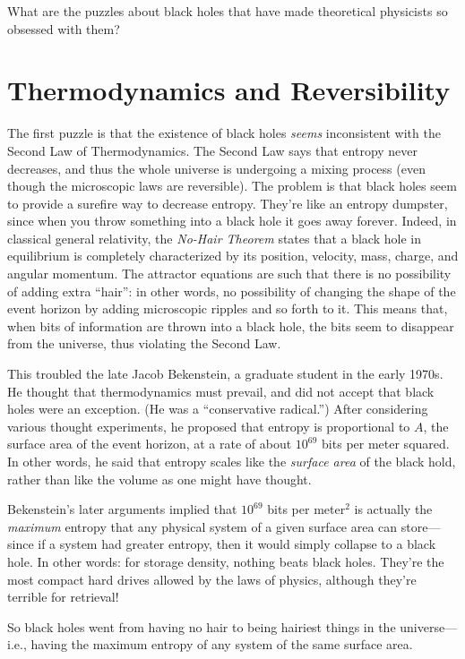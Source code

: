 \documentclass[11pt]{report}
\theoremstyle{plain}
\theoremstyle{definition}
\begin{document}
What are the puzzles about black holes that have made theoretical physicists so obsessed with them?

\section{Thermodynamics and Reversibility}

The first puzzle is that the existence of black holes {\em seems} inconsistent with
the Second Law of Thermodynamics.
The Second Law says that entropy never decreases,
and thus the whole universe is undergoing a mixing process
(even though the microscopic laws are reversible).
The problem is that black holes seem to provide a surefire way to decrease entropy. They're like
an entropy dumpster, since when you throw something into a black
hole it goes away forever.
Indeed, in classical general relativity, the {\it No-Hair Theorem}
states that a black hole in equilibrium is completely characterized by its
position, velocity,
mass, charge, and angular momentum.
The attractor equations are such that there
is no possibility of adding extra ``hair'': in other words, no possibility of changing
the shape of the event horizon by adding microscopic ripples and so forth to it.
This means that, when bits of information are
thrown into a black hole, the bits seem to disappear from the universe,
thus violating the Second Law.

This troubled the late Jacob Bekenstein, a graduate student in the early 1970s.
He thought that thermodynamics must prevail, and did not accept
that black holes were an exception.
(He was a ``conservative radical.'')
After considering various thought experiments, he proposed
that entropy is proportional to $A$, the surface area of
the event horizon, at a rate of about $10^{69}$ bits per meter squared.
In other words, he said that entropy scales like the {\em surface area} of the black
hold, rather than like the volume as one might have thought.

Bekenstein's later arguments implied that $10^{69}$ bits per meter$^2$ is actually the {\em maximum}
entropy that any physical system of a given surface area can store---since if a system had greater entropy,
then it would simply collapse to a black hole.  In other words: for storage density, nothing beats black holes.
They're the most compact hard drives allowed by the laws of physics, although they're terrible for retrieval!

So black holes went from having no hair to being hairiest things in the universe---i.e.,
having the maximum entropy of any system of the same surface area.
\end{document}
